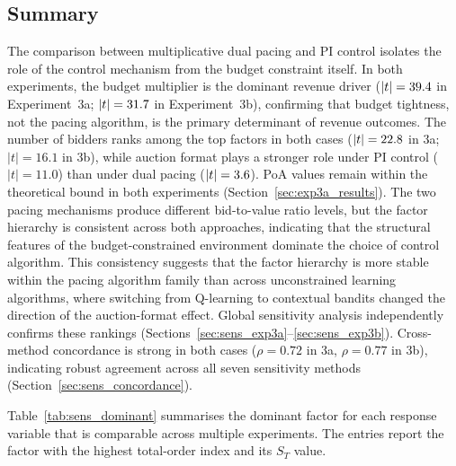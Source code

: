 \subsection{Summary}

The comparison between multiplicative dual pacing and PI control isolates the role of the control mechanism from the budget constraint itself. In both experiments, the budget multiplier is the dominant revenue driver ($|t| = 39.4$ in Experiment~3a; $|t| = 31.7$ in Experiment~3b), confirming that budget tightness, not the pacing algorithm, is the primary determinant of revenue outcomes. The number of bidders ranks among the top factors in both cases ($|t| = 22.8$ in 3a; $|t| = 16.1$ in 3b), while auction format plays a stronger role under PI control ($|t| = 11.0$) than under dual pacing ($|t| = 3.6$). PoA values remain within the theoretical bound in both experiments (Section~\ref{sec:exp3a_results}). The two pacing mechanisms produce different bid-to-value ratio levels, but the factor hierarchy is consistent across both approaches, indicating that the structural features of the budget-constrained environment dominate the choice of control algorithm. This consistency suggests that the factor hierarchy is more stable within the pacing algorithm family than across unconstrained learning algorithms, where switching from Q-learning to contextual bandits changed the direction of the auction-format effect. Global sensitivity analysis independently confirms these rankings (Sections~\ref{sec:sens_exp3a}--\ref{sec:sens_exp3b}). Cross-method concordance is strong in both cases ($\rho = 0.72$ in 3a, $\rho = 0.77$ in 3b), indicating robust agreement across all seven sensitivity methods (Section~\ref{sec:sens_concordance}).

\label{sec:sens_synthesis}

Table~\ref{tab:sens_dominant} summarises the dominant factor for each response variable that is comparable across multiple experiments. The entries report the factor with the highest total-order index and its $S_T$ value.

